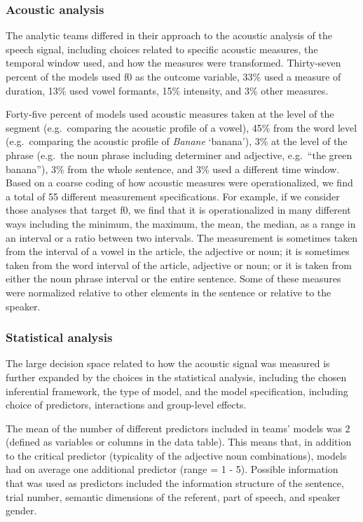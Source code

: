 \documentclass[Review,times,sageh]{sagej}
\begin{document}
\hypertarget{acoustic-analysis}{%
\subsubsection{Acoustic analysis}\label{acoustic-analysis}}

The analytic teams differed in their approach to the acoustic analysis of the speech signal, including choices related to specific acoustic measures, the temporal window used, and how the measures were transformed.
Thirty-seven percent of the models used f0 as the outcome variable, 33\% used a measure of duration, 13\% used vowel formants, 15\% intensity, and 3\% other measures.

Forty-five percent of models used acoustic measures taken at the level of the segment (e.g.~comparing the acoustic profile of a vowel), 45\% from the word level (e.g.~comparing the acoustic profile of \emph{Banane} `banana'), 3\% at the level of the phrase (e.g.~the noun phrase including determiner and adjective, e.g.~``the green banana''), 3\% from the whole sentence, and 3\% used a different time window.
Based on a coarse coding of how acoustic measures were operationalized, we find a total of 55 different measurement specifications.
For example, if we consider those analyses that target f0, we find that it is operationalized in many different ways including the minimum, the maximum, the mean, the median, as a range in an interval or a ratio between two intervals.
The measurement is sometimes taken from the interval of a vowel in the article, the adjective or noun; it is sometimes taken from the word interval of the article, adjective or noun; or it is taken from either the noun phrase interval or the entire sentence.
Some of these measures were normalized relative to other elements in the sentence or relative to the speaker.

\hypertarget{statistical-analysis}{%
\subsubsection{Statistical analysis}\label{statistical-analysis}}

The large decision space related to how the acoustic signal was measured is further expanded by the choices in the statistical analysis, including the chosen inferential framework, the type of model, and the model specification, including choice of predictors, interactions and group-level effects.

The mean of the number of different predictors included in teams' models was 2 (defined as variables or columns in the data table).
This means that, in addition to the critical predictor (typicality of the adjective noun combinations), models had on average one additional predictor (range = 1 - 5).
Possible information that was used as predictors included the information structure of the sentence, trial number, semantic dimensions of the referent, part of speech, and speaker gender.
\end{document}
